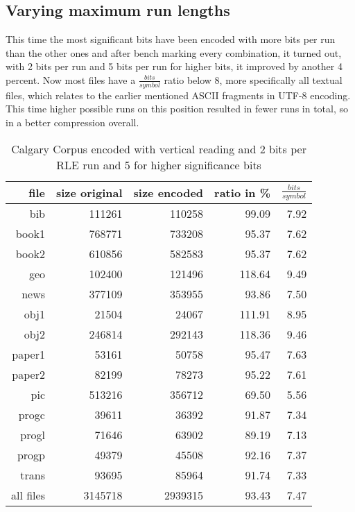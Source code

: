 \subsection{Varying maximum run lengths}
\label{ch:Conceptual Design:sec:var lengths}
\par{
This time the most significant bits have been encoded with more bits per run than the other ones and after bench marking every combination, it turned out, with 2 bits per run and 5 bits per run for higher bits, it improved by another 4 percent. Now most files have a $\frac{bits}{symbol}$ ratio below 8, more specifically all textual files, which relates to the earlier mentioned ASCII fragments in UTF-8 encoding. This time higher possible runs on this position resulted in fewer runs in total, so in a better compression overall.
\begin{table}[H]
	\centering
	\begin{tabular}{r|r|r|r|r}	
		file & size original & size encoded & ratio in \% & $\frac{bits}{symbol}$\\
		\hline
		bib & 111261 & 110258 & 99.09 & 7.92\\
		book1 & 768771 & 733208 & 95.37 & 7.62 \\
		book2 & 610856 & 582583 & 95.37 & 7.62\\
		geo & 102400 & 121496 & 118.64 & 9.49\\
		news & 377109 & 353955 & 93.86 & 7.50\\
		obj1 & 21504 & 24067 & 111.91 & 8.95\\
		obj2& 246814 & 292143 & 118.36 & 9.46\\		 
		paper1 & 53161 & 50758 & 95.47 & 7.63\\		 
		paper2& 82199 & 78273 & 95.22 & 7.61\\		 
		pic & 513216 & 356712 & 69.50 & 5.56\\		 
		progc & 39611 & 36392 & 91.87 & 7.34\\		 
		progl & 71646 & 63902 & 89.19 & 7.13\\		 
		progp & 49379 & 45508 & 92.16 & 7.37\\		 
		trans & 93695 & 85964 & 91.74 & 7.33\\
		\hline
		all files & 3145718 & 2939315 & 93.43 & 7.47
	\end{tabular}
	\caption{Calgary Corpus encoded with vertical reading and 2 bits per RLE run and 5 for higher significance bits}
\label{tab:t42 Calgary Corpus encoded with vertical reading and 2 bits per RLE run and 5 for higher significance bits}
\end{table}

}
